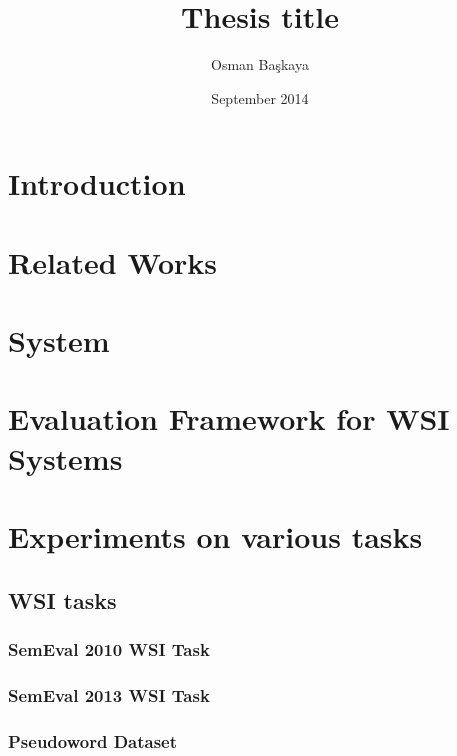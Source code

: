 \documentclass[a4paper, 12pt]{book}
\title{Thesis title}
\author{Osman Başkaya}
\date{September 2014}
\begin{document}
\maketitle




\tableofcontents

\chapter{Introduction}

\chapter{Related Works}

\chapter{System}


\chapter{Evaluation Framework for WSI Systems}


\chapter{Experiments on various tasks}

\section{WSI tasks}
\subsection{SemEval 2010 WSI Task}\label{subsection:semeval10}

\subsection{SemEval 2013 WSI Task}

\subsection{Pseudoword Dataset}
\end{document}
